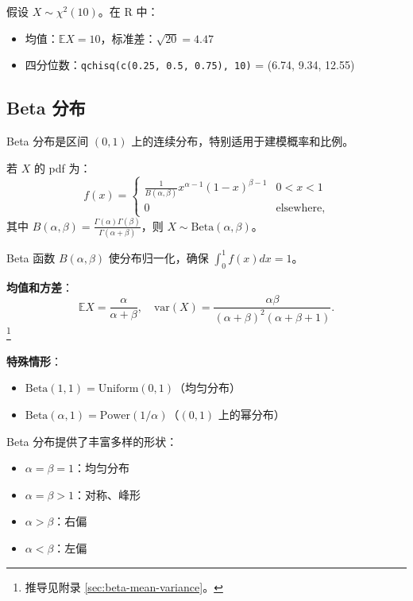 \begin{example}[卡方分位数]\label{ex:chi-square-percentiles-ch3}
假设 $X \sim \chi^{2}(10)$。在 R 中：
\begin{itemize}
\item 均值：$\mathbb{E}X = 10$，标准差：$\sqrt{20} = 4.47$
\item 四分位数：\texttt{qchisq(c(0.25, 0.5, 0.75), 10)} = (6.74, 9.34, 12.55)
\end{itemize}
\end{example}

\subsection{Beta 分布}\label{sub:beta-distribution-ch3}

Beta 分布是区间 $(0,1)$ 上的连续分布，特别适用于建模概率和比例。

\begin{definition}[Beta 分布]\label{def:beta-distribution-ch3}
若 $X$ 的 pdf 为：
\[
f(x) = \begin{cases}
\frac{1}{B(\alpha,\beta)} x^{\alpha-1}(1-x)^{\beta-1} & 0 < x < 1 \\[4pt]
0 & \text{elsewhere},
\end{cases}
\label{eq:beta-pdf-ch3}
\]
其中 $B(\alpha,\beta) = \frac{\Gamma(\alpha)\Gamma(\beta)}{\Gamma(\alpha+\beta)}$，则 $X \sim \text{Beta}(\alpha, \beta)$。
\end{definition}

Beta 函数 $B(\alpha, \beta)$ 使分布归一化，确保 $\int_{0}^{1} f(x) dx = 1$。

\textbf{均值和方差}：
\[
\mathbb{E}X = \frac{\alpha}{\alpha+\beta}, \quad \text{var}(X) = \frac{\alpha\beta}{(\alpha+\beta)^{2}(\alpha+\beta+1)}.
\label{eq:beta-moments-ch3}
\]\footnote{推导见附录 \cref{sec:beta-mean-variance}。}

\textbf{特殊情形}：
\begin{itemize}
\item $\text{Beta}(1,1) = \text{Uniform}(0,1)$（均匀分布）
\item $\text{Beta}(\alpha, 1) = \text{Power}(1/\alpha)$（$(0,1)$ 上的幂分布）
\end{itemize}

\begin{example}\label{ex:beta-shapes-ch3}
Beta 分布提供了丰富多样的形状：
\begin{itemize}
\item $\alpha = \beta = 1$：均匀分布
\item $\alpha = \beta > 1$：对称、峰形
\item $\alpha > \beta$：右偏
\item $\alpha < \beta$：左偏
\end{itemize}
\end{example}

